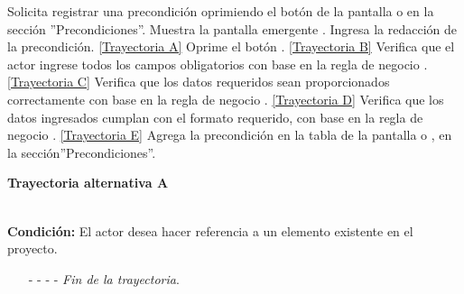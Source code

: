 	\begin{UCtrayectoria}
		\UCpaso[\UCactor] Solicita registrar una precondición oprimiendo el botón  de la pantalla  o  en la sección ''Precondiciones''.
		\UCpaso[\UCsist] Muestra la pantalla emergente .
		\UCpaso[\UCactor] Ingresa la redacción de la precondición. \hyperlink{CU12-1-2:TAA}{[Trayectoria A]} \label{CU12.1.2-P3}
		\UCpaso[\UCactor] Oprime el botón . \hyperlink{CU12-1-2:TAB}{[Trayectoria B]} 
		\UCpaso[\UCsist] Verifica que el actor ingrese todos los campos obligatorios con base en la regla de negocio . \hyperlink{CU12-1-2:TAC}{[Trayectoria C]}
		\UCpaso[\UCsist] Verifica que los datos requeridos sean proporcionados correctamente con base en la regla de negocio . \hyperlink{CU12-1-2:TAD}{[Trayectoria D]}
		\UCpaso[\UCsist] Verifica que los datos ingresados cumplan con el formato requerido, con base en la regla de negocio . \hyperlink{CU12-1-2:TAE}{[Trayectoria E]}
		\UCpaso[\UCsist] Agrega la precondición en la tabla de la pantalla  o , en la sección''Precondiciones''.
	\end{UCtrayectoria}		
\hypertarget{CU12-1-2:TAA}{\textbf{Trayectoria alternativa A}}\\
\noindent \textbf{Condición:} El actor desea hacer referencia a un elemento existente en el proyecto.
\begin{enumerate}
	\UCpaso[\UCactor] Ingresa el token correspondiente al elemento a referenciar.
	\UCpaso[\UCsist] Verifica que los tokens utilizados se encuentren correctamente estructurados, con base en la regla de negocio . 
	\UCpaso[\UCsist] Obtiene los elementos registrados en el proyecto correspondientes al token ingresado. 
	\UCpaso[\UCsist] Muestra una lista con los elementos encontrados.
	\UCpaso[\UCactor] Selecciona un elemento de la lista.
	\UCpaso[\UCsist] Verifica que el nombre del elemento seleccionado no contenga espacios. \hyperlink{CU12-1-2:TAF}{[Trayectoria F]}
	\UCpaso[\UCsist] Agrega la referencia del elemento al texto. \label{CU12.1.2-TA1}
	\UCpaso Continúa en el paso \ref{CU12.1.2-P3} de la trayectoria principal.
	\item[- -] - - {\em {Fin de la trayectoria}}.%
\end{enumerate}
